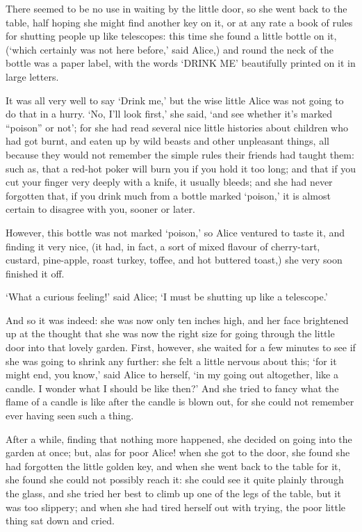 \documentclass[statementpaper,twoside,openany]{memoir}
\begin{document}
There seemed to be no use in waiting by the little door, so she went back to the table, half hoping she might find another key on it, or at any rate a book of rules for shutting people up like telescopes: this time she found a little bottle on it, (`which certainly was not here before,' said Alice,) and round the neck of the bottle was a paper label, with the words `DRINK ME' beautifully printed on it in large letters.

It was all very well to say `Drink me,' but the wise little Alice was not going to do that in a hurry. `No, I'll look first,' she said, `and see whether it's marked ``poison'' or not'; for she had read several nice little histories about children who had got burnt, and eaten up by wild beasts and other unpleasant things, all because they would not remember the simple rules their friends had taught them: such as, that a red-hot poker will burn you if you hold it too long; and that if you cut your finger very deeply with a knife, it usually bleeds; and she had never forgotten that, if you drink much from a bottle marked `poison,' it is almost certain to disagree with you, sooner or later.

However, this bottle was not marked `poison,' so Alice ventured to taste it, and finding it very nice, (it had, in fact, a sort of mixed flavour of cherry-tart, custard, pine-apple, roast turkey, toffee, and hot buttered toast,) she very soon finished it off.

`What a curious feeling!' said Alice; `I must be shutting up like a telescope.'

And so it was indeed: she was now only ten inches high, and her face brightened up at the thought that she was now the right size for going through the little door into that lovely garden. First, however, she waited for a few minutes to see if she was going to shrink any further: she felt a little nervous about this; `for it might end, you know,' said Alice to herself, `in my going out altogether, like a candle. I wonder what I should be like then?' And she tried to fancy what the flame of a candle is like after the candle is blown out, for she could not remember ever having seen such a thing.

After a while, finding that nothing more happened, she decided on going into the garden at once; but, alas for poor Alice! when she got to the door, she found she had forgotten the little golden key, and when she went back to the table for it, she found she could not possibly reach it: she could see it quite plainly through the glass, and she tried her best to climb up one of the legs of the table, but it was too slippery; and when she had tired herself out with trying, the poor little thing sat down and cried.
\end{document}
